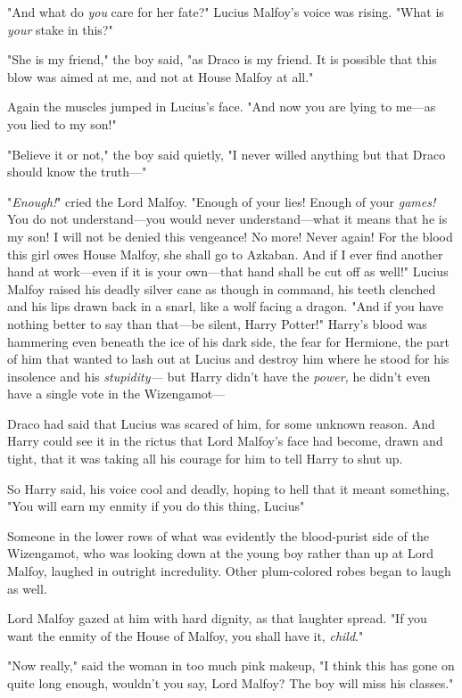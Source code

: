 "And what do \emph{you} care for her fate?" Lucius Malfoy's voice was rising.
"What is \emph{your} stake in this?"

"She is my friend," the boy said, "as Draco is my friend. It is possible that
this blow was aimed at me, and not at House Malfoy at all."

Again the muscles jumped in Lucius's face. "And now you are lying to me—as
you lied to my son!"

"Believe it or not," the boy said quietly, "I never willed anything but that
Draco should know the truth—"

"\emph{Enough!}" cried the Lord Malfoy. "Enough of your lies! Enough of your
\emph{games!} You do not understand—you would never understand—what it
means that he is my son! I will not be denied this vengeance! No more! Never
again! For the blood this girl owes House Malfoy, she shall go to Azkaban. And
if I ever find another hand at work—even if it is your own—that hand shall
be cut off as well!" Lucius Malfoy raised his deadly silver cane as though in
command, his teeth clenched and his lips drawn back in a snarl, like a wolf
facing a dragon. "And if you have nothing better to say than that—be silent,
Harry Potter!"
\sbreak
Harry's blood was hammering even beneath the ice of his dark side, the fear for
Hermione, the part of him that wanted to lash out at Lucius and destroy him
where he stood for his insolence and his \emph{stupidity—} but Harry didn't
have the \emph{power,} he didn't even have a single vote in the Wizengamot—

Draco had said that Lucius was scared of him, for some unknown reason. And
Harry could see it in the rictus that Lord Malfoy's face had become, drawn and
tight, that it was taking all his courage for him to tell Harry to shut up.

So Harry said, his voice cool and deadly, hoping to hell that it meant
something, "You will earn my enmity if you do this thing, Lucius{\el}"

Someone in the lower rows of what was evidently the blood-purist side of the
Wizengamot, who was looking down at the young boy rather than up at Lord
Malfoy, laughed in outright incredulity. Other plum-colored robes began to
laugh as well.

Lord Malfoy gazed at him with hard dignity, as that laughter spread. "If you
want the enmity of the House of Malfoy, you shall have it, \emph{child}."

"Now really," said the woman in too much pink makeup, "I think this has gone on
quite long enough, wouldn't you say, Lord Malfoy? The boy will miss his
classes."

